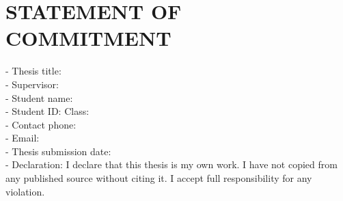 
\chapter*{STATEMENT OF COMMITMENT}

\noindent
- Thesis title: \thesistitle \\
- Supervisor: \supervisor \\
- Student name: \authorname \\
- Student ID: \studentid \quad Class: \studentclass \\
- Contact phone: \phone \\
- Email: \email \\
- Thesis submission date: \submissiondate \\
- Declaration: I declare that this thesis is my own work. I have not copied from any published source without citing it. I accept full responsibility for any violation.
